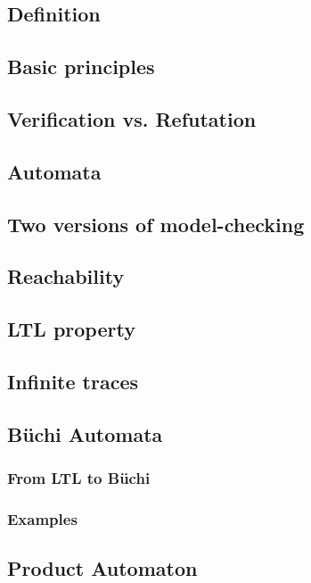\documentclass[12pt, a4paper]{book}
\begin{document}
  \subsection{Definition}
  \label{sub:Definition}
  \subsection{Basic principles}
  \label{sub:Basic principles}
  \subsection{Verification vs. Refutation}
  \label{sub:Verification vs. Refutation}
  \subsection{Automata}
  \label{sub:Automata}
  \subsection{Two versions of model-checking}
  \label{sub:Two versions of model-checking}
  \subsection{Reachability}
  \label{sub:Reachability}
  \subsection{LTL property}
  \label{sub:LTL property}
  \subsection{Infinite traces}
  \label{sub:Infinite traces}
  \subsection{Büchi Automata}
  \label{sub:Büchi Automata}
  \subsubsection{From LTL to Büchi}
  \label{subs:From LTL to Büchi}
  \subsubsection{Examples}
  \label{subs:Examples}
  \subsection{Product Automaton}
  \label{sub:Product Automaton}
\end{document}
